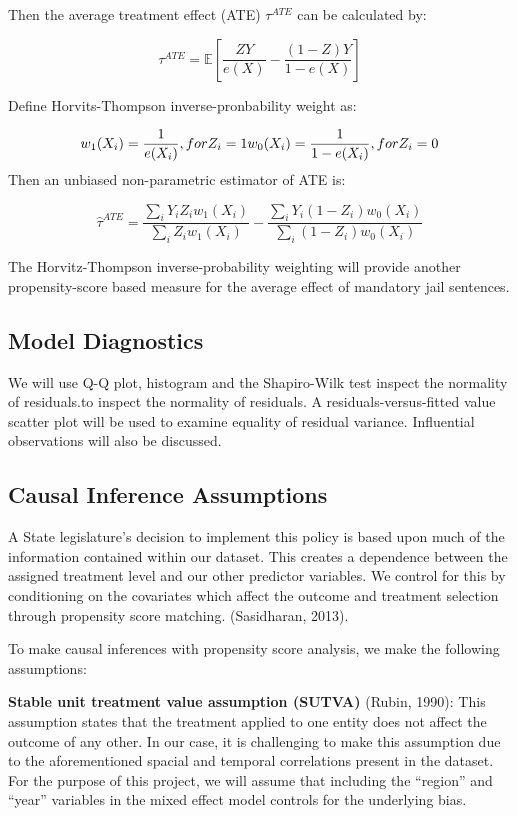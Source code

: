 \documentclass[]{article}
\begin{document}
Then the average treatment effect (ATE) \(\tau^{ATE}\) can be calculated by:

\[
\tau^{ATE} = \mathbb{E}[\frac{ZY}{e(X)} - \frac{(1-Z)Y}{1-e(X)}]
\]

Define Horvits-Thompson inverse-pronbability weight as:

\[
w_1(X_i) = \frac{1}{e(X_i)}, for Z_i = 1 \\
w_0(X_i) = \frac{1}{1-e(X_i)}, for Z_i = 0
\]
Then an unbiased non-parametric estimator of ATE is:

\[
\hat{\tau}^{ATE} = \frac{\displaystyle\sum\limits_iY_iZ_iw_1(X_i)}{\displaystyle\sum\limits_iZ_iw_1(X_i)} - \frac{\displaystyle\sum\limits_iY_i(1-Z_i)w_0(X_i)}{\displaystyle\sum\limits_i(1-Z_i)w_0(X_i)}
\]

The Horvitz-Thompson inverse-probability weighting will provide another propensity-score based measure for the average effect of mandatory jail sentences.

\hypertarget{model-diagnostics}{%
\subsection{Model Diagnostics}\label{model-diagnostics}}

We will use Q-Q plot, histogram and the Shapiro-Wilk test inspect the normality of residuals.to inspect the normality of residuals. A residuals-versus-fitted value scatter plot will be used to examine equality of residual variance. Influential observations will also be discussed.

\hypertarget{causal-inference-assumptions}{%
\subsection{Causal Inference Assumptions}\label{causal-inference-assumptions}}

A State legislature's decision to implement this policy is based upon much of the information contained within our dataset. This creates a dependence between the assigned treatment level and our other predictor variables. We control for this by conditioning on the covariates which affect the outcome and treatment selection through propensity score matching. (Sasidharan, 2013).

To make causal inferences with propensity score analysis, we make the following assumptions:

\textbf{Stable unit treatment value assumption (SUTVA)} (Rubin, 1990): This assumption states that the treatment applied to one entity does not affect the outcome of any other. In our case, it is challenging to make this assumption due to the aforementioned spacial and temporal correlations present in the dataset. For the purpose of this project, we will assume that including the ``region'' and ``year'' variables in the mixed effect model controls for the underlying bias.
\end{document}
